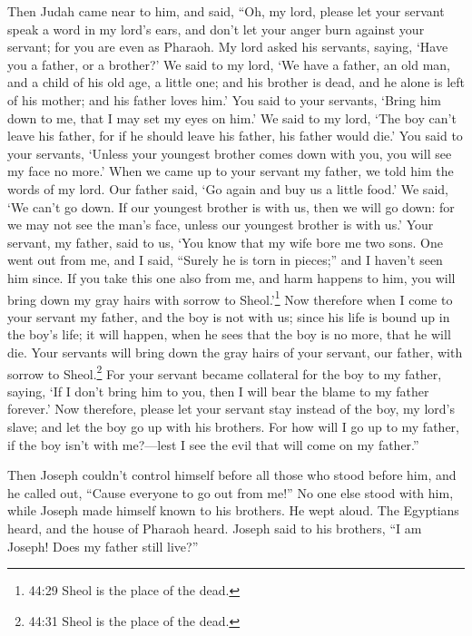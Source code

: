 \myverse{}Then Judah came near to him, and said, “Oh, my lord, please let your servant speak a word in my lord’s ears, and don’t let your anger burn against your servant; for you are even as Pharaoh.  \myverse{}My lord asked his servants, saying, ‘Have you a father, or a brother?’  \myverse{}We said to my lord, ‘We have a father, an old man, and a child of his old age, a little one; and his brother is dead, and he alone is left of his mother; and his father loves him.’  \myverse{}You said to your servants, ‘Bring him down to me, that I may set my eyes on him.’  \myverse{}We said to my lord, ‘The boy can’t leave his father, for if he should leave his father, his father would die.’  \myverse{}You said to your servants, ‘Unless your youngest brother comes down with you, you will see my face no more.’  \myverse{}When we came up to your servant my father, we told him the words of my lord.  \myverse{}Our father said, ‘Go again and buy us a little food.’  \myverse{} We said, ‘We can’t go down. If our youngest brother is with us, then we will go down: for we may not see the man’s face, unless our youngest brother is with us.’  \myverse{}Your servant, my father, said to us, ‘You know that my wife bore me two sons.  \myverse{}One went out from me, and I said, “Surely he is torn in pieces;” and I haven’t seen him since.  \myverse{}If you take this one also from me, and harm happens to him, you will bring down my gray hairs with sorrow to Sheol.’\footnote{44:29 Sheol is the place of the dead.}  \myverse{}Now therefore when I come to your servant my father, and the boy is not with us; since his life is bound up in the boy’s life;  \myverse{}it will happen, when he sees that the boy is no more, that he will die. Your servants will bring down the gray hairs of your servant, our father, with sorrow to Sheol.\footnote{44:31 Sheol is the place of the dead.}  \myverse{}For your servant became collateral for the boy to my father, saying, ‘If I don’t bring him to you, then I will bear the blame to my father forever.’  \myverse{}Now therefore, please let your servant stay instead of the boy, my lord’s slave; and let the boy go up with his brothers.  \myverse{}For how will I go up to my father, if the boy isn’t with me?—lest I see the evil that will come on my father.”

\mychapter{}
\myverse*{}Then Joseph couldn’t control himself before all those who stood before him, and he called out, “Cause everyone to go out from me!” No one else stood with him, while Joseph made himself known to his brothers.  \myverse{}He wept aloud. The Egyptians heard, and the house of Pharaoh heard.  \myverse{}Joseph said to his brothers, “I am Joseph! Does my father still live?”

